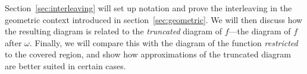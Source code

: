 Section~\ref{sec:interleaving} will set up notation and prove the interleaving in the geometric context introduced in section~\ref{sec:geometric}.
We will then discuss how the resulting diagram is related to the \emph{truncated} diagram of $f$---the diagram of $f$ after $\omega$.
Finally, we will compare this with the diagram of the function \emph{restricted} to the covered region, and show how approximations of the truncated diagram are better suited in certain cases.
